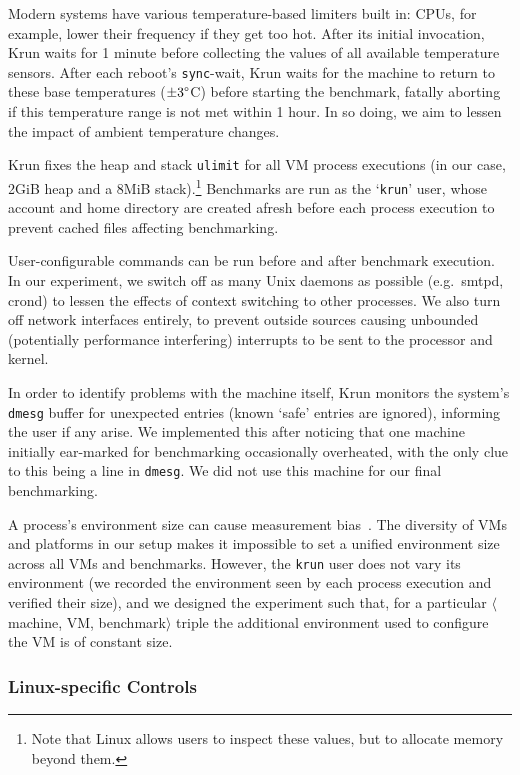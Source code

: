 \documentclass[acmlarge]{acmart}\settopmatter{printfolios=true}
\newcommand{\krun}{Krun\xspace}
\newcommand{\mvmbtrip}{$\langle$machine, VM, benchmark$\rangle$\xspace}
\begin{document}
Modern systems have various temperature-based limiters built in:
CPUs, for example, lower their frequency if they get too hot.
After its initial invocation, \krun waits for 1 minute before collecting
the values of all available temperature sensors. After each reboot's \texttt{sync}-wait, \krun waits
for the machine to return to these base temperatures ($\pm3\degree$C) before
starting the benchmark, fatally aborting if this temperature range is not
met within 1 hour. In so doing, we aim to lessen the impact of ambient temperature changes.

\krun fixes the heap and stack \texttt{ulimit} for all VM process executions
(in our case, 2GiB heap and a 8MiB stack).\footnote{Note that Linux allows users
to inspect these values, but to allocate memory beyond them.} Benchmarks are run
as the `\texttt{krun}' user, whose account and home directory are created
afresh before each process execution to prevent cached files affecting benchmarking.

User-configurable commands can be run before and after benchmark execution. In
our experiment, we switch off as many Unix daemons as possible (e.g.~smtpd,
crond) to lessen the effects of context switching to other processes. We also
turn off network interfaces entirely, to prevent outside sources causing unbounded
(potentially performance interfering) interrupts to be sent to the processor and kernel.

In order to identify problems with the machine itself, \krun monitors the
system's \texttt{dmesg} buffer for unexpected entries (known `safe' entries
are ignored), informing the user if any arise. We implemented this after
noticing that one machine initially ear-marked for benchmarking occasionally
overheated, with the only clue to this being a line in \texttt{dmesg}.
We did not use this machine for our final benchmarking.

A process's environment size can cause measurement
bias~\cite{mytkowicz09surprising}. The diversity of VMs and platforms
in our setup makes it impossible to set a unified environment size across all VMs and
benchmarks. However, the \texttt{krun} user does not
vary its environment (we recorded the environment seen by each process
execution and verified their size), and we designed the experiment such that, for a particular \mvmbtrip
triple the additional environment used to configure the VM is of constant
size.


\subsubsection{Linux-specific Controls}
\end{document}
